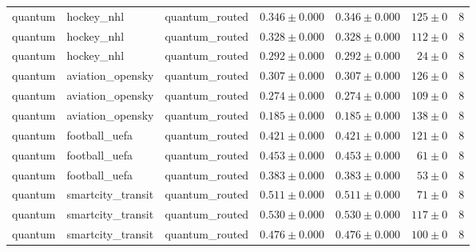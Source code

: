 \begin{table}[htbp]
\begin{tabular}{l l l r r r r}
quantum & hockey\_nhl & quantum\_routed & $0.346\pm0.000$ & $0.346\pm0.000$ & $125\pm0$ & 8 \\
quantum & hockey\_nhl & quantum\_routed & $0.328\pm0.000$ & $0.328\pm0.000$ & $112\pm0$ & 8 \\
quantum & hockey\_nhl & quantum\_routed & $0.292\pm0.000$ & $0.292\pm0.000$ & $24\pm0$ & 8 \\
quantum & aviation\_opensky & quantum\_routed & $0.307\pm0.000$ & $0.307\pm0.000$ & $126\pm0$ & 8 \\
quantum & aviation\_opensky & quantum\_routed & $0.274\pm0.000$ & $0.274\pm0.000$ & $109\pm0$ & 8 \\
quantum & aviation\_opensky & quantum\_routed & $0.185\pm0.000$ & $0.185\pm0.000$ & $138\pm0$ & 8 \\
quantum & football\_uefa & quantum\_routed & $0.421\pm0.000$ & $0.421\pm0.000$ & $121\pm0$ & 8 \\
quantum & football\_uefa & quantum\_routed & $0.453\pm0.000$ & $0.453\pm0.000$ & $61\pm0$ & 8 \\
quantum & football\_uefa & quantum\_routed & $0.383\pm0.000$ & $0.383\pm0.000$ & $53\pm0$ & 8 \\
quantum & smartcity\_transit & quantum\_routed & $0.511\pm0.000$ & $0.511\pm0.000$ & $71\pm0$ & 8 \\
quantum & smartcity\_transit & quantum\_routed & $0.530\pm0.000$ & $0.530\pm0.000$ & $117\pm0$ & 8 \\
quantum & smartcity\_transit & quantum\_routed & $0.476\pm0.000$ & $0.476\pm0.000$ & $100\pm0$ & 8 \\
\hline
\end{tabular}
\end{table}
